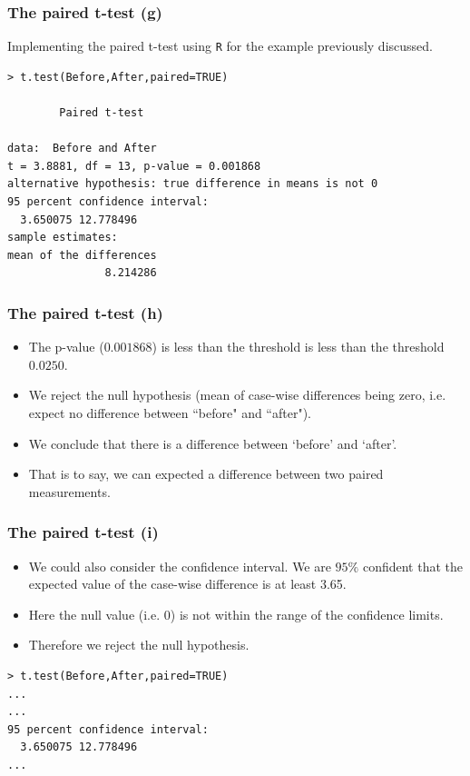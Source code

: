 \documentclass[a4]{beamer}
\begin{document}
\begin{frame}[fragile]
\frametitle{The paired t-test (g)}
Implementing the paired t-test using \texttt{R} for the example previously discussed.
\begin{verbatim}
> t.test(Before,After,paired=TRUE)

        Paired t-test

data:  Before and After
t = 3.8881, df = 13, p-value = 0.001868
alternative hypothesis: true difference in means is not 0
95 percent confidence interval:
  3.650075 12.778496
sample estimates:
mean of the differences
               8.214286

\end{verbatim}
\end{frame}

\begin{frame}[fragile]
\frametitle{The paired t-test (h)}
\begin{itemize}
\item The p-value ($0.001868$) is less than the threshold is less than the threshold $0.0250$.
\item We reject the null hypothesis (mean of case-wise differences being zero, i.e. expect no difference between ``before" and ``after").
\item We conclude that there is a difference between `before' and `after'.
\item That is to say, we can expected a difference between two paired measurements.
\end{itemize}
\end{frame}
\begin{frame}[fragile]
\frametitle{The paired t-test (i)}
\begin{itemize}
\item We could also consider the confidence interval. We are $95\%$ confident that the expected value of the case-wise difference is at least 3.65.
\item Here the null value (i.e. 0) is not within the range of the confidence limits.
\item Therefore we reject the null hypothesis.
\end{itemize}
\begin{verbatim}
> t.test(Before,After,paired=TRUE)
...
...
95 percent confidence interval:
  3.650075 12.778496
...
\end{verbatim}
\end{frame}
\end{document}
